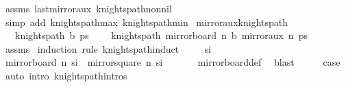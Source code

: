 \begin{isabellebody}
\ assms\ last{\isacharunderscore}{\kern0pt}mirror{}{\isacharunderscore}{\kern0pt}aux\ knights{\isacharunderscore}{\kern0pt}path{\isacharunderscore}{\kern0pt}non{\isacharunderscore}{\kern0pt}nil\isanewline
\ \ \isamarkupfalse%
\ {\isacharparenleft}{\kern0pt}simp\ add{\isacharcolon}{\kern0pt}\ knights{\isacharunderscore}{\kern0pt}path{\isacharunderscore}{\kern0pt}max{}\ knights{\isacharunderscore}{\kern0pt}path{\isacharunderscore}{\kern0pt}min{}{\isacharparenright}{\kern0pt}%
\endisatagproof
{\isafoldproof}%
%
\isadelimproof
\isanewline
%
\endisadelimproof
\isanewline
{}\isamarkupfalse%
\ mirror{}{\isacharunderscore}{\kern0pt}aux{\isacharunderscore}{\kern0pt}knights{\isacharunderscore}{\kern0pt}path{\isacharcolon}{\kern0pt}\isanewline
\ \ \ {\isachardoublequoteopen}knights{\isacharunderscore}{\kern0pt}path\ b\ ps{\isachardoublequoteclose}\ \isanewline
\ \ \ {\isachardoublequoteopen}knights{\isacharunderscore}{\kern0pt}path\ {\isacharparenleft}{\kern0pt}mirror{}{\isacharunderscore}{\kern0pt}board\ n\ b{\isacharparenright}{\kern0pt}\ {\isacharparenleft}{\kern0pt}mirror{}{\isacharunderscore}{\kern0pt}aux\ n\ ps{\isacharparenright}{\kern0pt}{\isachardoublequoteclose}\isanewline
%
\isadelimproof
\ \ %
\endisadelimproof
%
\isatagproof
{}\isamarkupfalse%
\ assms\isanewline
{}\isamarkupfalse%
\ {\isacharparenleft}{\kern0pt}induction\ rule{\isacharcolon}{\kern0pt}\ knights{\isacharunderscore}{\kern0pt}path{\isachardot}{\kern0pt}induct{\isacharparenright}{\kern0pt}\isanewline
\ \ \isamarkupfalse%
\ {\isacharparenleft}{\kern0pt}{}\ s\isactrlsub i{\isacharparenright}{\kern0pt}\isanewline
\ \ \isamarkupfalse%
\ \isamarkupfalse%
\ {\isachardoublequoteopen}mirror{}{\isacharunderscore}{\kern0pt}board\ n\ {\isacharbraceleft}{\kern0pt}s\isactrlsub i{\isacharbraceright}{\kern0pt}\ {\isacharequal}{\kern0pt}\ {\isacharbraceleft}{\kern0pt}mirror{}{\isacharunderscore}{\kern0pt}square\ n\ s\isactrlsub i{\isacharbraceright}{\kern0pt}{\isachardoublequoteclose}\ \isanewline
\ \ \ \ \isamarkupfalse%
\ mirror{}{\isacharunderscore}{\kern0pt}board{\isacharunderscore}{\kern0pt}def\ \isamarkupfalse%
\ blast\isanewline
\ \ \isamarkupfalse%
\ \isamarkupfalse%
\ {\isacharquery}{\kern0pt}case\ \isamarkupfalse%
\ {\isacharparenleft}{\kern0pt}auto\ intro{\isacharcolon}{\kern0pt}\ knights{\isacharunderscore}{\kern0pt}path{\isachardot}{\kern0pt}intros{\isacharparenright}{\kern0pt}\isanewline

\end{isabellebody}

